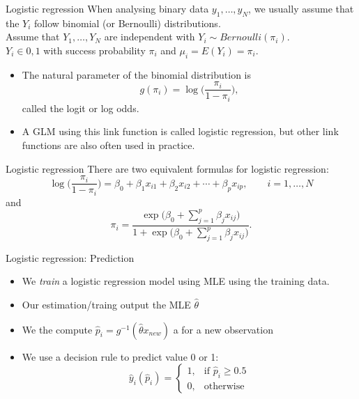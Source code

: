 \documentclass[10pt,handout]{beamer}
\begin{document}
\begin{frame}{Logistic regression}
When analysing binary data $y_1,\ldots,y_N$, we usually assume that the $Y_i$ follow binomial (or Bernoulli) distributions.\\[3mm ]\pause
Assume that $Y_1,\ldots,Y_N$ are independent with $Y_i \sim Bernoulli(\pi_i)$.\\[3mm ]\pause
$Y_i \in {0,1}$ with success probability $\pi_i$ and $\mu_i=E(Y_i)=\pi_i$.\\[3mm ]\pause
\begin{itemize}
\item The natural parameter of the binomial distribution is $$g(\pi_i)=\log\Big(\frac{\pi_i}{1-\pi_i}\Big),$$
called the {\color{uured}logit} or {\color{uured}log odds}.\\[3mm ]\pause
\item A GLM using this link function is called {\color{uured}logistic regression}, but other link functions are also often used in practice.\\[3mm]
\end{itemize}
\end{frame}


\begin{frame}{Logistic regression}
There are two equivalent formulas for {\color{uured}logistic regression}:
$$\log\Big(\frac{\pi_i}{1-\pi_i}\Big)=\beta_0+\beta_1 x_{i1}+\beta_2 x_{i2}+\cdots+\beta_p x_{ip},\qquad i=1,\ldots,N$$
and
$$\pi_i=\frac{\exp\Big(\beta_0+\sum_{j=1}^p\beta_jx_{ij}\Big)}{1+\exp\Big(\beta_0+\sum_{j=1}^p\beta_jx_{ij}\Big)}.$$
\end{frame}


\begin{frame}{Logistic regression: Prediction}
\begin{itemize}
\item We \emph{train} a logistic regression model using MLE using the training data.
\item Our estimation/traing output the MLE $\hat{\theta}$
\item We the compute $\hat{p}_i = g^{-1}(\hat{\theta} x_{new})$ a for a new observation
\item We use a {\color{uured} decision rule} to predict value 0 or 1:
\[
    \hat{y}_i(\hat{p}_i)=
\begin{cases}
    1,& \text{if } \hat{p}_i \geq 0.5\\
    0,              & \text{otherwise}
\end{cases}
\]
\end{itemize}
\end{frame}
\end{document}
